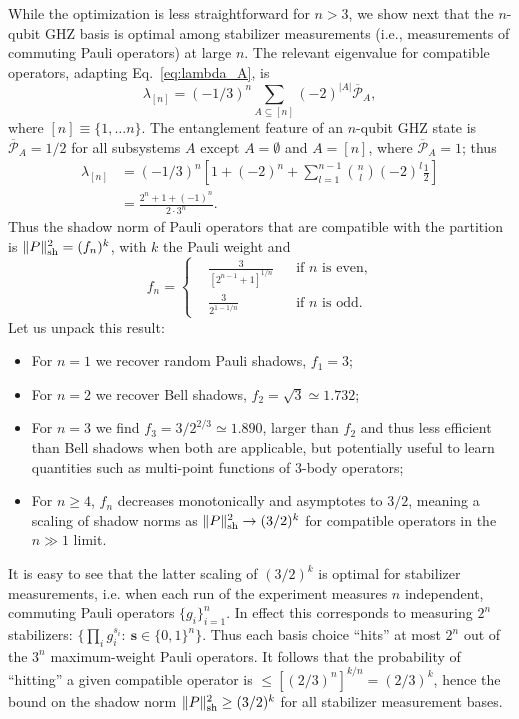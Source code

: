 \documentclass[a4paper,twocolumns,11pt,accepted=2024-03-04]{quantumarticle}
\newcommand{\shadownorm}[1]{\ensuremath{\| #1 \|_{\rm sh}}}
\begin{document}
While the optimization is less straightforward for $n>3$, we show next that the $n$-qubit GHZ basis is optimal among stabilizer measurements (i.e., measurements of commuting Pauli operators) at large $n$.
The relevant eigenvalue for compatible operators, adapting Eq.~\eqref{eq:lambda_A}, is
\begin{equation}
    \lambda_{[n]} = (-1/3)^n \sum_{A \subseteq [n]} (-2)^{|A|} \overline{\mathcal P}_A,
\end{equation}
where $[n] \equiv \{1,\dots n\}$.
The entanglement feature of an $n$-qubit GHZ state is $\overline{\mathcal P}_A = 1/2$ for all subsystems $A$ except $A = \emptyset$ and $A = [n]$, where $\overline{\mathcal P}_A = 1$; thus 
\begin{align}
    \lambda_{[n]}
    & = (-1/3)^n \left[ 1 + (-2)^n + \sum_{l = 1}^{n-1} \binom{n}{l} (-2)^l \frac{1}{2} \right] \nonumber \\
    & = \frac{2^n + 1 + (-1)^n}{2 \cdot 3^n}.
\end{align}
Thus the shadow norm of Pauli operators that are compatible with the partition is $\shadownorm{P}^2 = (f_n)^k$, with $k$ the Pauli weight and 
\begin{equation}
    f_n = 
    \left\{ 
    \begin{aligned}
    & \frac{3}{[2^{n-1}+1]^{1/n}} & & \text{if $n$ is even,} \\
    & \frac{3}{2^{1-1/n}} & & \text{if $n$ is odd.}
    \end{aligned}
    \right. \label{eq:ghz_scaling}
\end{equation}
Let us unpack this result:
\begin{itemize}
    \item For $n=1$ we recover random Pauli shadows, $f_1 = 3$;
    \item For $n=2$ we recover Bell shadows, $f_2 = \sqrt{3} \simeq 1.732$;
    \item For $n=3$ we find $f_3 = 3 / 2^{2/3} \simeq 1.890$, larger than $f_2$ and thus less efficient than Bell shadows when both are applicable, but potentially useful to learn quantities such as multi-point functions of 3-body operators;
    \item For $n\geq 4$, $f_n$ decreases monotonically and asymptotes to $3/2$, meaning a scaling of shadow norms as $\shadownorm{P}^2 \to (3/2)^k$ for compatible operators in the $n\gg 1$ limit.
\end{itemize}

It is easy to see that the latter scaling of $(3/2)^k$ is optimal for stabilizer measurements, i.e. when each run of the experiment measures $n$ independent, commuting Pauli operators $\{g_i\}_{i=1}^n$.
In effect this corresponds to measuring $2^n$ stabilizers: $\{ \prod_i g_i^{s_i}:\ \mathbf s\in \{0,1\}^n \}$. Thus each basis choice ``hits'' at most $2^n$ out of the $3^n$ maximum-weight Pauli operators. It follows that the probability of ``hitting'' a given compatible operator is $\leq [(2/3)^n]^{k/n} = (2/3)^k$, hence the bound on the shadow norm $\shadownorm{P}^2 \geq (3/2)^k$ for all stabilizer measurement bases. 
\end{document}
